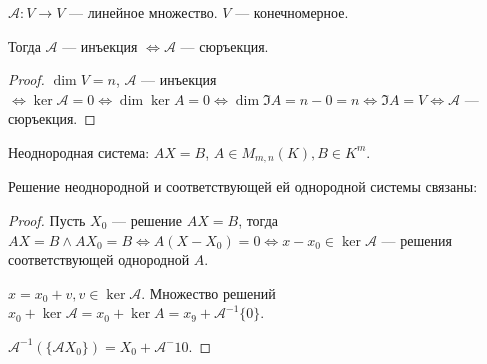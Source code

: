 \begin{theorem}
    $\mathcal{A}\!: V \to V$ --- линейное множество.  $V$ --- конечномерное.

    Тогда  $\mathcal{A}$ --- инъекция  $\iff \mathcal{A}$ --- сюръекция.
\end{theorem}
\begin{proof}
    $\dim V = n$,  $\mathcal{A}$ --- инъекция  $\iff \ker \mathcal{A} = 0 \iff \dim \ker A = 0 \iff \dim \Im A = n - 0 = n \iff \Im A = V \iff \mathcal{A}$ --- сюръекция.
\end{proof}

\begin{definition}
    Неоднородная система: $AX=B$,  $A \in M_{m, n}(K), B \in K^m$.
\end{definition}
\begin{theorem}
    Решение неоднородной и соответствующей ей однородной системы связаны:

\end{theorem}
\begin{proof}
    Пусть $X_0$ --- решение $AX=B$, тогда  $AX=B \land AX_0=B \iff A(X-X_0) = 0 \iff x - x_0 \in \ker \mathcal{A}$ --- решения соответствующей однородной $A$.
    
    $x = x_0 + v, v \in \ker \mathcal{A} $. Множество решений $x_0 + \ker \mathcal{A} = x_0 + \ker A = x_9 + \mathcal{A}^{-1}\{0\}$. 

    $\mathcal{A}^{-1}(\{\mathcal{A} X_0\}) = X_0 + \mathcal{A}^-1{0}$.
\end{proof}

